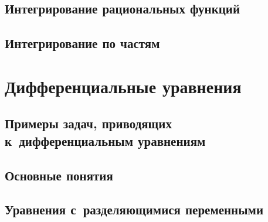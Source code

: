 \documentclass[14pt, oneside]{extbook}
\begin{document}
\section{Интегрирование рациональных функций}

\section{Интегрирование по частям}



\chapter{Дифференциальные уравнения}

\section{Примеры задач, приводящих к~дифференциальным уравнениям}

\section{Основные понятия}

\section{Уравнения с~разделяющимися переменными}

\end{document}

